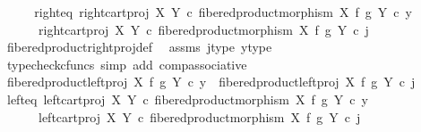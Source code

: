 \begin{isabellebody}
\ \ \isamarkupfalse%
\ \isamarkupfalse%
\ right{\isacharunderscore}{\kern0pt}eq{\isacharcolon}{\kern0pt}\ {\isachardoublequoteopen}right{\isacharunderscore}{\kern0pt}cart{\isacharunderscore}{\kern0pt}proj\ X\ Y\ {\isasymcirc}\isactrlsub c\ {\isacharparenleft}{\kern0pt}fibered{\isacharunderscore}{\kern0pt}product{\isacharunderscore}{\kern0pt}morphism\ X\ f\ g\ Y\ {\isasymcirc}\isactrlsub c\ y{\isacharparenright}{\kern0pt}\ {\isacharequal}{\kern0pt}\isanewline
\ \ \ \ \ \ right{\isacharunderscore}{\kern0pt}cart{\isacharunderscore}{\kern0pt}proj\ X\ Y\ {\isasymcirc}\isactrlsub c\ {\isacharparenleft}{\kern0pt}fibered{\isacharunderscore}{\kern0pt}product{\isacharunderscore}{\kern0pt}morphism\ X\ f\ g\ Y\ {\isasymcirc}\isactrlsub c\ j{\isacharparenright}{\kern0pt}{\isachardoublequoteclose}\isanewline
\ \ \ \ \isamarkupfalse%
\ fibered{\isacharunderscore}{\kern0pt}product{\isacharunderscore}{\kern0pt}right{\isacharunderscore}{\kern0pt}proj{\isacharunderscore}{\kern0pt}def\ \isamarkupfalse%
\ assms\ j{\isacharunderscore}{\kern0pt}type\ y{\isacharunderscore}{\kern0pt}type\isanewline
\ \ \ \ \isamarkupfalse%
\ {\isacharparenleft}{\kern0pt}typecheck{\isacharunderscore}{\kern0pt}cfuncs{\isacharcomma}{\kern0pt}\ simp\ add{\isacharcolon}{\kern0pt}\ comp{\isacharunderscore}{\kern0pt}associative{}{\isacharparenright}{\kern0pt}\isanewline
\ \ \isamarkupfalse%
\ {\isachardoublequoteopen}fibered{\isacharunderscore}{\kern0pt}product{\isacharunderscore}{\kern0pt}left{\isacharunderscore}{\kern0pt}proj\ X\ f\ g\ Y\ {\isasymcirc}\isactrlsub c\ y\ {\isacharequal}{\kern0pt}\ fibered{\isacharunderscore}{\kern0pt}product{\isacharunderscore}{\kern0pt}left{\isacharunderscore}{\kern0pt}proj\ X\ f\ g\ Y\ {\isasymcirc}\isactrlsub c\ j{\isachardoublequoteclose}\isanewline
\ \ \isamarkupfalse%
\ \isamarkupfalse%
\ left{\isacharunderscore}{\kern0pt}eq{\isacharcolon}{\kern0pt}\ {\isachardoublequoteopen}left{\isacharunderscore}{\kern0pt}cart{\isacharunderscore}{\kern0pt}proj\ X\ Y\ {\isasymcirc}\isactrlsub c\ {\isacharparenleft}{\kern0pt}fibered{\isacharunderscore}{\kern0pt}product{\isacharunderscore}{\kern0pt}morphism\ X\ f\ g\ Y\ {\isasymcirc}\isactrlsub c\ y{\isacharparenright}{\kern0pt}\ {\isacharequal}{\kern0pt}\isanewline
\ \ \ \ \ \ left{\isacharunderscore}{\kern0pt}cart{\isacharunderscore}{\kern0pt}proj\ X\ Y\ {\isasymcirc}\isactrlsub c\ {\isacharparenleft}{\kern0pt}fibered{\isacharunderscore}{\kern0pt}product{\isacharunderscore}{\kern0pt}morphism\ X\ f\ g\ Y\ {\isasymcirc}\isactrlsub c\ j{\isacharparenright}{\kern0pt}{\isachardoublequoteclose}\isanewline

\end{isabellebody}
